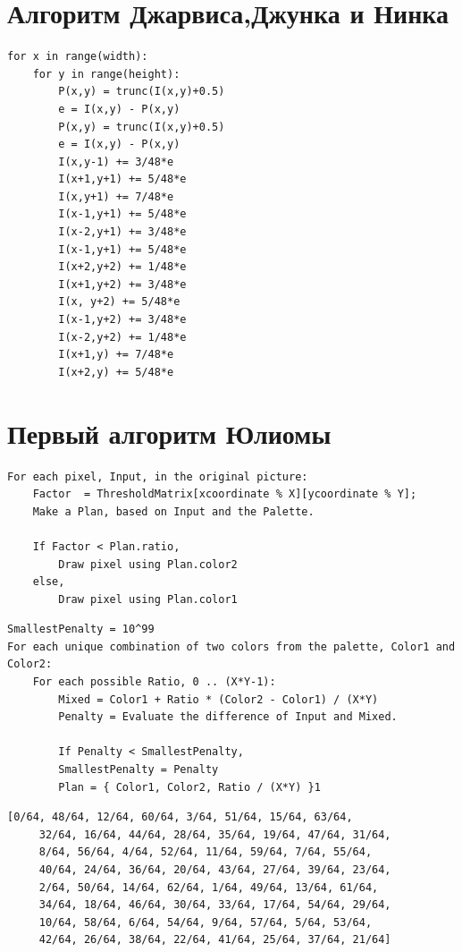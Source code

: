 \section{Алгоритм Джарвиса,Джунка и Нинка}

\begin{lstlisting}[style=pseudocode,caption={Алгоритм Джарвиса,Джунка и Нинка}]
for x in range(width):
    for y in range(height):
        P(x,y) = trunc(I(x,y)+0.5)
        e = I(x,y) - P(x,y)
        P(x,y) = trunc(I(x,y)+0.5)
        e = I(x,y) - P(x,y)
        I(x,y-1) += 3/48*e
        I(x+1,y+1) += 5/48*e
        I(x,y+1) += 7/48*e
        I(x-1,y+1) += 5/48*e
        I(x-2,y+1) += 3/48*e
        I(x-1,y+1) += 5/48*e
        I(x+2,y+2) += 1/48*e
        I(x+1,y+2) += 3/48*e
        I(x, y+2) += 5/48*e
        I(x-1,y+2) += 3/48*e
        I(x-2,y+2) += 1/48*e
        I(x+1,y) += 7/48*e
        I(x+2,y) += 5/48*e

\end{lstlisting}
\section{Первый алгоритм Юлиомы}
\begin{lstlisting}[style=pseudocode,caption={Первый алгоритм Юлиомы}]
For each pixel, Input, in the original picture:
    Factor  = ThresholdMatrix[xcoordinate % X][ycoordinate % Y];
    Make a Plan, based on Input and the Palette.

    If Factor < Plan.ratio,
        Draw pixel using Plan.color2
    else,
        Draw pixel using Plan.color1
\end{lstlisting}

\begin{lstlisting}[style=pseudocode,caption={План нахождения цвета пикселя}]
SmallestPenalty = 10^99 
For each unique combination of two colors from the palette, Color1 and Color2:
    For each possible Ratio, 0 .. (X*Y-1):
        Mixed = Color1 + Ratio * (Color2 - Color1) / (X*Y)
        Penalty = Evaluate the difference of Input and Mixed.

        If Penalty < SmallestPenalty,
        SmallestPenalty = Penalty
        Plan = { Color1, Color2, Ratio / (X*Y) }1
\end{lstlisting}
\begin{lstlisting}[style=pseudocode,caption={Вспомогательная матрица перого Алгоритма Юлиомы}]
     [0/64, 48/64, 12/64, 60/64, 3/64, 51/64, 15/64, 63/64,
     32/64, 16/64, 44/64, 28/64, 35/64, 19/64, 47/64, 31/64,
     8/64, 56/64, 4/64, 52/64, 11/64, 59/64, 7/64, 55/64,
     40/64, 24/64, 36/64, 20/64, 43/64, 27/64, 39/64, 23/64,
     2/64, 50/64, 14/64, 62/64, 1/64, 49/64, 13/64, 61/64,
     34/64, 18/64, 46/64, 30/64, 33/64, 17/64, 54/64, 29/64,
     10/64, 58/64, 6/64, 54/64, 9/64, 57/64, 5/64, 53/64,
     42/64, 26/64, 38/64, 22/64, 41/64, 25/64, 37/64, 21/64]
\end{lstlisting}



